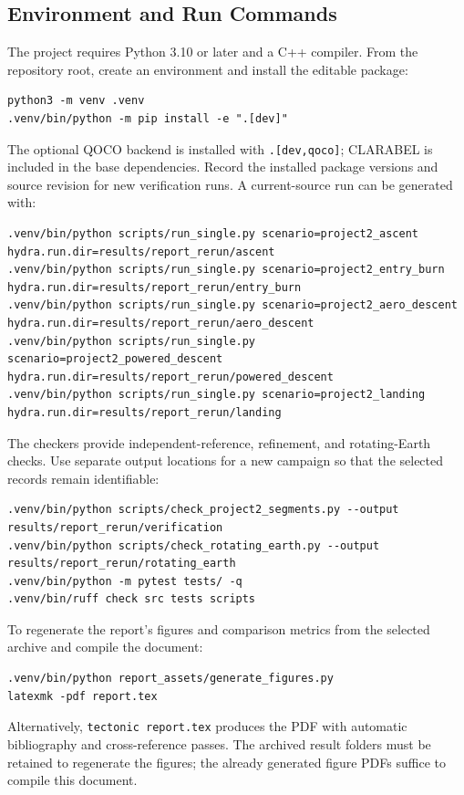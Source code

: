 \documentclass[11pt,letterpaper]{article}
\newcommand{\code}[1]{\texttt{#1}}
\begin{document}
\subsection{Environment and Run Commands}
The project requires Python 3.10 or later and a C++ compiler. From the repository root, create an environment and install the editable package:
\begin{lstlisting}
python3 -m venv .venv
.venv/bin/python -m pip install -e ".[dev]"
\end{lstlisting}
The optional QOCO backend is installed with \code{.[dev,qoco]}; CLARABEL is included in the base dependencies. Record the installed package versions and source revision for new verification runs. A current-source run can be generated with:
\begin{lstlisting}
.venv/bin/python scripts/run_single.py scenario=project2_ascent hydra.run.dir=results/report_rerun/ascent
.venv/bin/python scripts/run_single.py scenario=project2_entry_burn hydra.run.dir=results/report_rerun/entry_burn
.venv/bin/python scripts/run_single.py scenario=project2_aero_descent hydra.run.dir=results/report_rerun/aero_descent
.venv/bin/python scripts/run_single.py scenario=project2_powered_descent hydra.run.dir=results/report_rerun/powered_descent
.venv/bin/python scripts/run_single.py scenario=project2_landing hydra.run.dir=results/report_rerun/landing
\end{lstlisting}
The checkers provide independent-reference, refinement, and rotating-Earth checks. Use separate output locations for a new campaign so that the selected records remain identifiable:
\begin{lstlisting}
.venv/bin/python scripts/check_project2_segments.py --output results/report_rerun/verification
.venv/bin/python scripts/check_rotating_earth.py --output results/report_rerun/rotating_earth
.venv/bin/python -m pytest tests/ -q
.venv/bin/ruff check src tests scripts
\end{lstlisting}
To regenerate the report's figures and comparison metrics from the selected archive and compile the document:
\begin{lstlisting}
.venv/bin/python report_assets/generate_figures.py
latexmk -pdf report.tex
\end{lstlisting}
Alternatively, \code{tectonic report.tex} produces the PDF with automatic bibliography and cross-reference passes. The archived result folders must be retained to regenerate the figures; the already generated figure PDFs suffice to compile this document.
\end{document}
